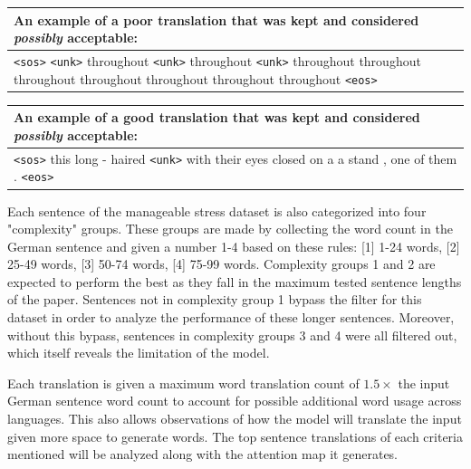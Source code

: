 \documentclass[11pt,a4paper]{article}
\begin{document}
\begin{center}
\begin{tabular}{p{2.5in}}
    An example of a \textbf{poor} translation that was kept and considered \textit{possibly} acceptable:\\
    \hline
    \verb|<sos>| \verb|<unk>| throughout \verb|<unk>| throughout \verb|<unk>| throughout throughout throughout throughout throughout throughout throughout \verb|<eos>|\\
    \hline
\end{tabular}
\end{center}

\begin{center}
\begin{tabular}{p{2.5in}}
    An example of a \textbf{good} translation that was kept and considered \textit{possibly} acceptable:\\
    \hline
    \verb|<sos>| this long - haired \verb|<unk>| with their eyes closed on a a stand , one of them . \verb|<eos>|\\
    \hline
\end{tabular}
\end{center}

Each sentence of the manageable stress dataset is also categorized into four "complexity" groups. These groups are made by collecting the word count in the German sentence and given a number 1-4 based on these rules: [1] 1-24 words, [2] 25-49 words, [3] 50-74 words, [4] 75-99 words. Complexity groups 1 and 2 are expected to perform the best as they fall in the maximum tested sentence lengths of the paper. Sentences not in complexity group 1 bypass the filter for this dataset in order to analyze the performance of these longer sentences. Moreover, without this bypass, sentences in complexity groups 3 and 4 were all filtered out, which itself reveals the limitation of the model. 

Each translation is given a maximum word translation count of $1.5\times$ the input German sentence word count to account for possible additional word usage across languages. This also allows observations of how the model will translate the input given more space to generate words. The top sentence translations of each criteria mentioned will be analyzed along with the attention map it generates. 

\end{document}

